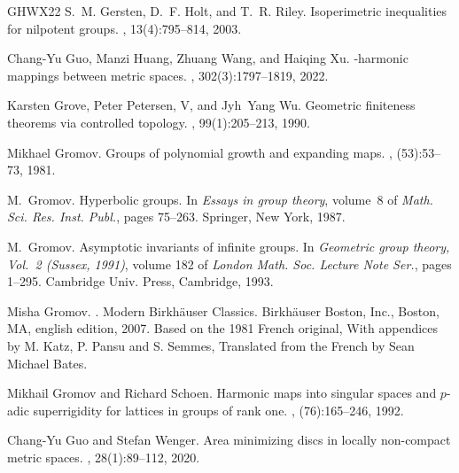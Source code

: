 \documentclass[a4paper,leqno]{amsart}
\numberwithin{equation}{section}
\theoremstyle{remark}
\theoremstyle{remark}
\begin{document}
\begin{thebibliography}{GHWX22}
S.~M. Gersten, D.~F. Holt, and T.~R. Riley.
\newblock Isoperimetric inequalities for nilpotent groups.
, 13(4):795--814, 2003.

Chang-Yu Guo, Manzi Huang, Zhuang Wang, and Haiqing Xu.
-harmonic mappings between metric spaces.
, 302(3):1797--1819, 2022.

Karsten Grove, Peter Petersen, V, and Jyh~Yang Wu.
\newblock Geometric finiteness theorems via controlled topology.
, 99(1):205--213, 1990.

Mikhael Gromov.
\newblock Groups of polynomial growth and expanding maps.
, (53):53--73, 1981.

M.~Gromov.
\newblock Hyperbolic groups.
\newblock In {\em Essays in group theory}, volume~8 of {\em Math. Sci. Res. Inst. Publ.}, pages 75--263. Springer, New York, 1987.

M.~Gromov.
\newblock Asymptotic invariants of infinite groups.
\newblock In {\em Geometric group theory, {V}ol.\ 2 ({S}ussex, 1991)}, volume 182 of {\em London Math. Soc. Lecture Note Ser.}, pages 1--295. Cambridge Univ. Press, Cambridge, 1993.

Misha Gromov.
.
\newblock Modern Birkh\"{a}user Classics. Birkh\"{a}user Boston, Inc., Boston, MA, english edition, 2007.
\newblock Based on the 1981 French original, With appendices by M. Katz, P. Pansu and S. Semmes, Translated from the French by Sean Michael Bates.

Mikhail Gromov and Richard Schoen.
\newblock Harmonic maps into singular spaces and {$p$}-adic superrigidity for lattices in groups of rank one.
, (76):165--246, 1992.

Chang-Yu Guo and Stefan Wenger.
\newblock Area minimizing discs in locally non-compact metric spaces.
, 28(1):89--112, 2020.


\end{thebibliography}
\end{document}
